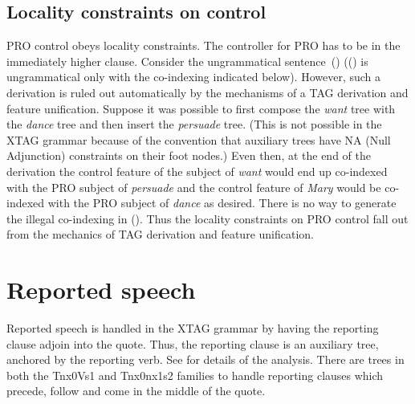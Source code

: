 \subsection{Locality constraints on control}
PRO control obeys locality constraints. The controller for PRO has to be
in the immediately higher clause. Consider the ungrammatical sentence~()
(() is ungrammatical only with the co-indexing indicated below).
However, such a derivation is ruled out automatically by the 
mechanisms of a TAG derivation and feature unification. 
Suppose it was possible to first compose the {\em want} tree with the
{\em dance} tree and then insert the {\em persuade} tree. (This is not
possible in the XTAG grammar because of the convention that
auxiliary trees have NA (Null Adjunction) constraints on their foot nodes.)
Even then, at the end of the derivation the control feature of the 
subject of {\em want} would end up co-indexed with the PRO subject of
{\em persuade} and the control feature of {\em Mary} would be co-indexed with the
PRO subject of {\em dance} as desired. There is no way to generate the illegal
co-indexing in (). Thus the locality constraints on PRO control 
fall out from the mechanics of TAG derivation and feature unification. 



\section{Reported speech}

Reported speech is handled in the XTAG grammar by having the reporting
clause adjoin into the quote. Thus, the reporting clause is an
auxiliary tree, anchored by the reporting verb. See \cite{doran-diss}
for details of the analysis. There are trees in both the Tnx0Vs1 and
Tnx0nx1s2 families to handle reporting clauses which precede, follow
and come in the middle of the quote.

